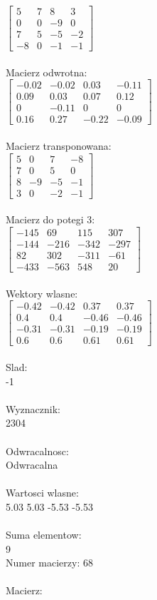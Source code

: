 \documentclass[a4paper,12pt]{article}
\begin{document}
$\begin{bmatrix} 5&7&8&3\\0&0&-9&0\\7&5&-5&-2\\-8&0&-1&-1 \end{bmatrix}$
\\
\\
Macierz odwrotna:\\

$\begin{bmatrix} -0.02&-0.02&0.03&-0.11\\0.09&0.03&0.07&0.12\\0&-0.11&0&0\\0.16&0.27&-0.22&-0.09 \end{bmatrix}$
\\
\\
Macierz transponowana:\\

$\begin{bmatrix} 5&0&7&-8\\7&0&5&0\\8&-9&-5&-1\\3&0&-2&-1 \end{bmatrix}$
\\
\\
Macierz do potegi 3:\\

$\begin{bmatrix} -145&69&115&307\\-144&-216&-342&-297\\82&302&-311&-61\\-433&-563&548&20 \end{bmatrix}$
\\
\\
Wektory wlasne:\\

$\begin{bmatrix} -0.42&-0.42&0.37&0.37\\0.4&0.4&-0.46&-0.46\\-0.31&-0.31&-0.19&-0.19\\0.6&0.6&0.61&0.61 \end{bmatrix}$
\\
\\
Slad:\\
-1
\\
\\
Wyznacznik:\\
2304
\\
\\
Odwracalnosc:\\
Odwracalna
\\
\\
Wartosci wlasne:\\
5.03 5.03 -5.53 -5.53
\\
\\
Suma elementow:\\
9
\\
\newpage
Numer macierzy:
68
\\
\\
Macierz:\\
\end{document}
